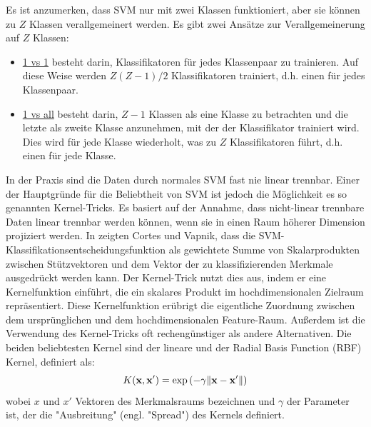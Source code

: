 Es ist anzumerken, dass SVM nur mit zwei Klassen funktioniert, aber sie können zu $ Z $ Klassen verallgemeinert werden.
Es gibt zwei Ansätze zur Verallgemeinerung auf $ Z $ Klassen:
\begin{itemize} %
  \item \underline{1 vs 1} besteht darin, Klassifikatoren für jedes Klassenpaar zu trainieren. Auf diese Weise werden $ Z(Z-1)/ 2$ Klassifikatoren trainiert, d.h. einen für jedes Klassenpaar.
  \item \underline{1 vs all} besteht darin, $ Z-1 $ Klassen als eine Klasse zu betrachten und die letzte als zweite Klasse anzunehmen, mit der der Klassifikator trainiert wird. Dies wird für jede Klasse wiederholt, was zu $ Z $ Klassifikatoren führt, d.h. einen für jede Klasse. \\
\end{itemize}


In der Praxis sind die Daten durch normales SVM fast nie linear trennbar.
Einer der Hauptgründe für die Beliebtheit von SVM ist jedoch die Möglichkeit es so genannten Kernel-Tricks.
Es basiert auf der Annahme, dass nicht-linear trennbare Daten linear trennbar werden können, wenn sie in einen Raum höherer Dimension projiziert werden.
In \cite{svn1995} zeigten Cortes und Vapnik, dass die SVM-Klassifikationsentscheidungsfunktion als gewichtete Summe von Skalarprodukten zwischen Stützvektoren und dem Vektor der zu klassifizierenden Merkmale ausgedrückt werden kann. 
Der Kernel-Trick nutzt dies aus, indem er eine Kernelfunktion einführt, die ein skalares Produkt im hochdimensionalen Zielraum repräsentiert. 
Diese Kernelfunktion erübrigt die eigentliche Zuordnung zwischen dem ursprünglichen und dem hochdimensionalen Feature-Raum.
Außerdem ist die Verwendung des Kernel-Tricks oft rechengünstiger als andere Alternativen.
Die beiden beliebtesten Kernel sind der lineare und der Radial Basis Function (RBF) Kernel, definiert als: 
\begin{equation} 
\Large{ {\displaystyle K(\mathbf {x} ,\mathbf {x'} )=\exp \left(-\gamma{\|\mathbf {x} -\mathbf {x'}}\right\|)} }
\end{equation}
wobei $ x $ und $ x' $ Vektoren des Merkmalsraums bezeichnen und $ \gamma $ der Parameter ist, der die "Ausbreitung" (engl. "Spread") des Kernels definiert. \\


